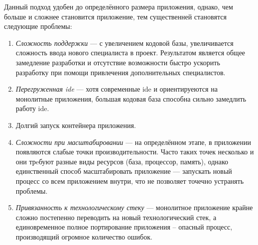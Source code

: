 Данный подход удобен до определённого размера приложения, однако, чем больше и сложнее становится приложение, тем существенней становятся следующие проблемы:

\begin{enumerate}
	\item \emph{Сложность поддержки} --- с увеличением кодовой базы, увеличивается сложность ввода нового специалиста в проект. Результатом является общее замедление разработки и отсутствие возможности быстро ускорить разработку при помощи привлечения дополнительных специалистов.
	\item \emph{Перегруженная \gls{ide}} --- хотя современные \gls{ide} и ориентируеются на монолитные приложения, большая кодовая база способна сильно замедлить работу \gls{ide}.
	\item Долгий запуск контейнера приложения.
	\item \emph{Сложности при масштабировании} --- на определённом этапе, в приложении появляются слабые точки производительности. Часто таких точек несколько и они трeбуют разные виды ресурсов (база, процессор, память), однако единственный способ масштабировать приложение --- запускать новый процесс со всем приложением внутри, что не позволяет точечно устранять проблемы.
	\item \emph{Привязанность к технологическому стеку} --- монолитное приложение крайне сложно постепенно переводить на новый технологический стек, а единовременное полное портирование приложения -- опасный процесс, производящий огромное количество ошибок.
\end{enumerate}